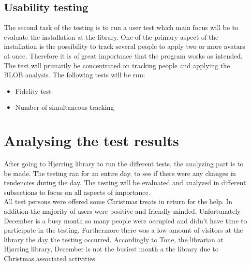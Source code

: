 \subsection{Usability testing}
The second task of the testing is to run a user test which main focus will be to evaluate the installation at the library. One of the primary aspect of the installation is the possibility to track several people to apply two or more avatars at once. Therefore it is of great importance that the program works as intended.\\
The test will primarily be concentrated on tracking people and applying the BLOB analysis. The following tests will be run:  
\begin{itemize}
\item Fidelity test
\item Number of simultaneous tracking
\end{itemize}

\section{Analysing the test results}
After going to Hj{\o}rring library to run the different tests, the analyzing part is to be made. The testing ran for an entire day, to see if there were any changes in tendencies during the day. The testing will be evaluated and analyzed in different subsections to focus on all aspects of importance. \\
All test persons were offered some Christmas treats in return for the help. In addition the majority of users were positive and friendly minded. Unfortunately December is a busy month so many people were occupied and didn't have time to participate in the testing. Furthermore there was a low amount of visitors at the library the day the testing occurred. Accordingly to Tone, the librarian at Hj{\o}rring library, December is not the busiest month a the library due to Christmas associated activities.

